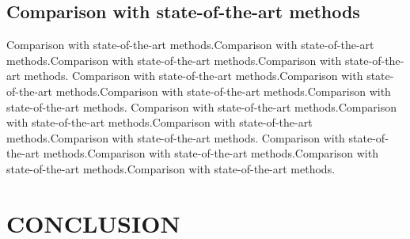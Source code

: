\documentclass{article}
\begin{document}
\subsection{Comparison with state-of-the-art methods}
\label{state-of-the-art methods}
Comparison with state-of-the-art methods.Comparison with state-of-the-art methods.Comparison with state-of-the-art methods.Comparison with state-of-the-art methods.
Comparison with state-of-the-art methods.Comparison with state-of-the-art methods.Comparison with state-of-the-art methods.Comparison with state-of-the-art methods.
Comparison with state-of-the-art methods.Comparison with state-of-the-art methods.Comparison with state-of-the-art methods.Comparison with state-of-the-art methods.
Comparison with state-of-the-art methods.Comparison with state-of-the-art methods.Comparison with state-of-the-art methods.Comparison with state-of-the-art methods.

%
%
%




\section{CONCLUSION}
\label{sec:typestyle}
\end{document}
